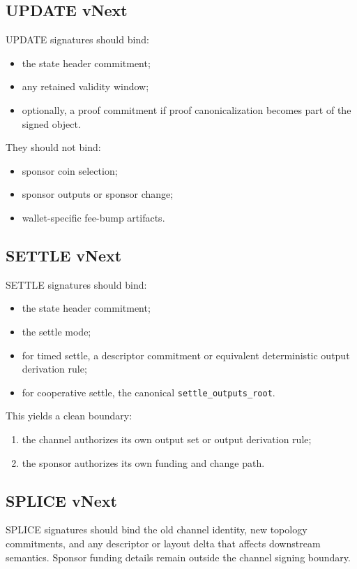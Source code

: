\documentclass[11pt,a4paper]{article}
\newcommand{\code}[1]{\texttt{#1}}
\begin{document}
\subsection{UPDATE vNext}

UPDATE signatures should bind:
\begin{itemize}
    \item the state header commitment;
    \item any retained validity window;
    \item optionally, a proof commitment if proof canonicalization becomes part of the signed object.
\end{itemize}

They should not bind:
\begin{itemize}
    \item sponsor coin selection;
    \item sponsor outputs or sponsor change;
    \item wallet-specific fee-bump artifacts.
\end{itemize}

\subsection{SETTLE vNext}

SETTLE signatures should bind:
\begin{itemize}
    \item the state header commitment;
    \item the settle mode;
    \item for timed settle, a descriptor commitment or equivalent deterministic output derivation rule;
    \item for cooperative settle, the canonical \code{settle\_outputs\_root}.
\end{itemize}

This yields a clean boundary:
\begin{enumerate}
    \item the channel authorizes its own output set or output derivation rule;
    \item the sponsor authorizes its own funding and change path.
\end{enumerate}

\subsection{SPLICE vNext}

SPLICE signatures should bind the old channel identity, new topology commitments, and any descriptor or layout delta that affects downstream semantics. Sponsor funding details remain outside the channel signing boundary.
\end{document}
